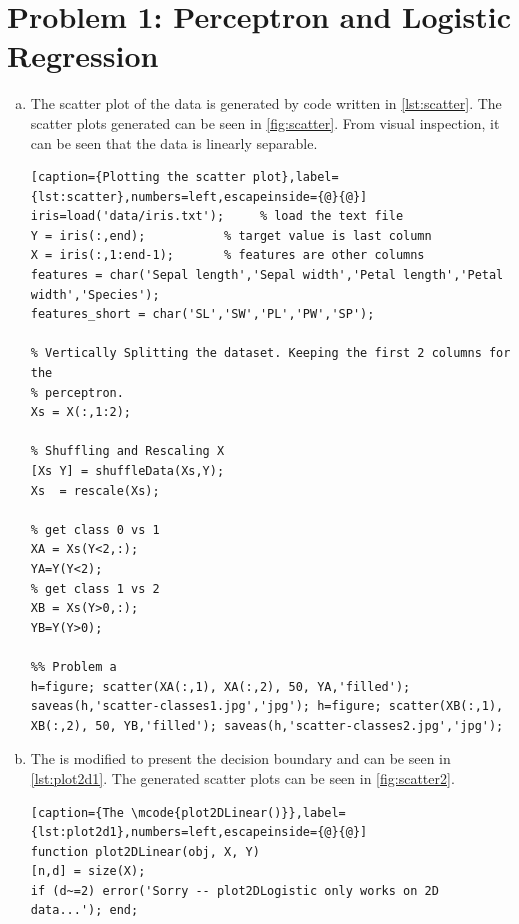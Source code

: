 \documentclass[a4paper, 11pt]{article}
\begin{document}
\section*{Problem 1: Perceptron and Logistic Regression}
\vspace{-10pt}
\begin{enumerate}[(a)]
\item The scatter plot of the data is generated by code written in \autoref{lst:scatter}. The scatter plots generated can be seen in \autoref{fig:scatter}. From visual inspection, it can be seen that the data is linearly separable.

\vspace{-25pt}
\begin{lstlisting}[caption={Plotting the scatter plot},label={lst:scatter},numbers=left,escapeinside={@}{@}]
iris=load('data/iris.txt');     % load the text file
Y = iris(:,end);           % target value is last column
X = iris(:,1:end-1);       % features are other columns
features = char('Sepal length','Sepal width','Petal length','Petal width','Species');
features_short = char('SL','SW','PL','PW','SP');

% Vertically Splitting the dataset. Keeping the first 2 columns for the
% perceptron.
Xs = X(:,1:2);

% Shuffling and Rescaling X
[Xs Y] = shuffleData(Xs,Y);
Xs  = rescale(Xs);

% get class 0 vs 1
XA = Xs(Y<2,:); 
YA=Y(Y<2);
% get class 1 vs 2
XB = Xs(Y>0,:); 
YB=Y(Y>0);

%% Problem a
h=figure; scatter(XA(:,1), XA(:,2), 50, YA,'filled'); saveas(h,'scatter-classes1.jpg','jpg'); h=figure; scatter(XB(:,1), XB(:,2), 50, YB,'filled'); saveas(h,'scatter-classes2.jpg','jpg');
\end{lstlisting}

\item The  is modified to present the decision boundary and can be seen in \autoref{lst:plot2d1}. The generated scatter plots can be seen in \autoref{fig:scatter2}.

\vspace{-20pt}
\begin{lstlisting}[caption={The \mcode{plot2DLinear()}},label={lst:plot2d1},numbers=left,escapeinside={@}{@}]
function plot2DLinear(obj, X, Y)
[n,d] = size(X);
if (d~=2) error('Sorry -- plot2DLogistic only works on 2D data...'); end;
  

\end{lstlisting}
\end{enumerate}
\end{document}
